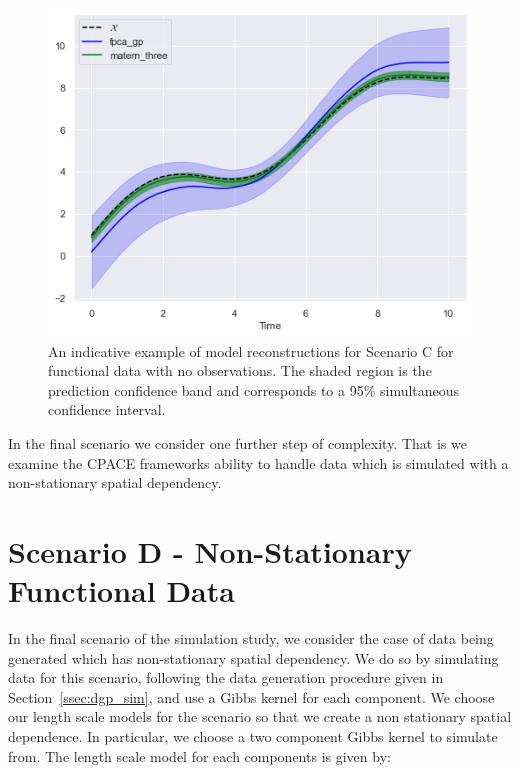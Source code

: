 \begin{figure}
	\centering
	\includegraphics[width=\textwidth]{sim_test_recon_C}
	\caption[An indicative example of model reconstructions for Scenario C for functional data with no observations.]{An indicative example of model reconstructions for Scenario C for functional data with no observations. The shaded region is the prediction confidence band and corresponds to a 95\% simultaneous confidence interval.}
	\label{fig:sim_test_recon_C}
\end{figure}

In the final scenario we consider one further step of complexity.
That is we examine the CPACE frameworks ability to handle data which is simulated with a non-stationary spatial dependency. 

\section{Scenario D - Non-Stationary Functional Data \label{sec:sim_D}}
In the final scenario of the simulation study, we consider the case of data being generated which has non-stationary spatial dependency.
We do so by simulating data for this scenario, following the data generation procedure given in Section~\ref{ssec:dgp_sim}, and use a Gibbs kernel for each component.
We choose our length scale models for the scenario so that we create a non stationary spatial dependence.
In particular, we choose a two component Gibbs kernel to simulate from. 
The length scale model for each components is given by:

